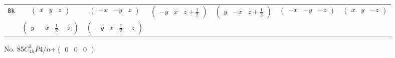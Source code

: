 \documentclass[fleqn,9pt,landscape]{jsarticle}
\begin{document}
\begin{center}
\begin{longtable}{ccccccc}
{\tt 8k} & $ \begin{pmatrix} x & y & z \end{pmatrix} $ & $ \begin{pmatrix} - x & - y & z \end{pmatrix} $ & $ \begin{pmatrix} - y & x & z + \frac{1}{2} \end{pmatrix} $ & $ \begin{pmatrix} y & - x & z + \frac{1}{2} \end{pmatrix} $ & $ \begin{pmatrix} - x & - y & - z \end{pmatrix} $ & $ \begin{pmatrix} x & y & - z \end{pmatrix} $ \\
& $ \begin{pmatrix} y & - x & \frac{1}{2} - z \end{pmatrix} $ & $ \begin{pmatrix} - y & x & \frac{1}{2} - z \end{pmatrix} $ & $  $ & $  $ & $  $ & $  $ \\
\end{longtable}
\end{center}
\newpage
No. 85\quad$C_{4h}^{3}$\quad$P4/n$\quad[ tetragonal ]\quad$+\begin{pmatrix} 0 & 0 & 0 \end{pmatrix}$
\end{document}
